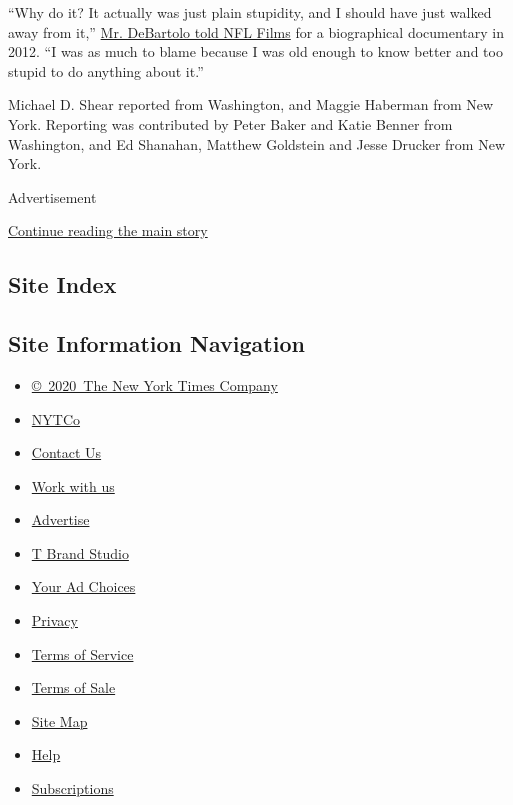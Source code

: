 ``Why do it? It actually was just plain stupidity, and I should have
just walked away from it,''
\href{https://www.cleveland.com/browns/2013/04/youngstowns_eddie_debartolo_a.html}{Mr.
DeBartolo told NFL Films} for a biographical documentary in 2012. ``I
was as much to blame because I was old enough to know better and too
stupid to do anything about it.''

Michael D. Shear reported from Washington, and Maggie Haberman from New
York. Reporting was contributed by Peter Baker and Katie Benner from
Washington, and Ed Shanahan, Matthew Goldstein and Jesse Drucker from
New York.

Advertisement

\protect\hyperlink{after-bottom}{Continue reading the main story}

\hypertarget{site-index}{%
\subsection{Site Index}\label{site-index}}

\hypertarget{site-information-navigation}{%
\subsection{Site Information
Navigation}\label{site-information-navigation}}

\begin{itemize}
\tightlist
\item
  \href{https://help.nytimes.com/hc/en-us/articles/115014792127-Copyright-notice}{©~2020~The
  New York Times Company}
\end{itemize}

\begin{itemize}
\tightlist
\item
  \href{https://www.nytco.com/}{NYTCo}
\item
  \href{https://help.nytimes.com/hc/en-us/articles/115015385887-Contact-Us}{Contact
  Us}
\item
  \href{https://www.nytco.com/careers/}{Work with us}
\item
  \href{https://nytmediakit.com/}{Advertise}
\item
  \href{http://www.tbrandstudio.com/}{T Brand Studio}
\item
  \href{https://www.nytimes.com/privacy/cookie-policy\#how-do-i-manage-trackers}{Your
  Ad Choices}
\item
  \href{https://www.nytimes.com/privacy}{Privacy}
\item
  \href{https://help.nytimes.com/hc/en-us/articles/115014893428-Terms-of-service}{Terms
  of Service}
\item
  \href{https://help.nytimes.com/hc/en-us/articles/115014893968-Terms-of-sale}{Terms
  of Sale}
\item
  \href{https://spiderbites.nytimes.com}{Site Map}
\item
  \href{https://help.nytimes.com/hc/en-us}{Help}
\item
  \href{https://www.nytimes.com/subscription?campaignId=37WXW}{Subscriptions}
\end{itemize}
